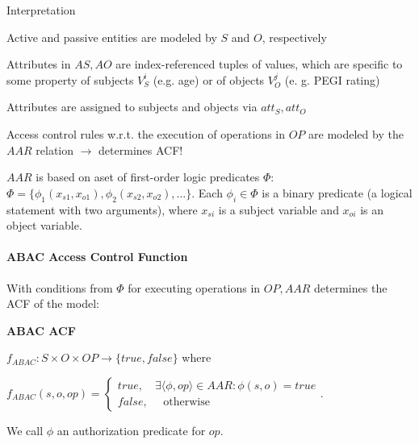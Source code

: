 \documentclass[a4paper]{article}
\renewcommand{\note}[2]{\begin{noteBox} \textbf{#1} #2 \end{noteBox}}
\begin{document}
\begin{multicols}{3}
    Interpretation
    \begin{itemize*}
        \item Active and passive entities are modeled by $S$ and $O$, respectively
        \item Attributes in $AS,AO$ are index-referenced tuples of values, which are specific to some property of subjects $V_S^i$ (e.g. age) or of objects $V_O^j$ (e. g. PEGI rating)
        \item Attributes are assigned to subjects and objects via $att_S,att_O$
        \item Access control rules w.r.t. the execution of operations in $OP$ are modeled by the $AAR$ relation $\rightarrow$ determines ACF!
        \item $AAR$ is based on aset of first-order logic predicates $\Phi$: $\Phi=\{\phi_1 (x_{s1},x_{o1}),\phi_2 (x_{s2},x_{o2}),...\}$. Each $\phi_i\in\Phi$ is a binary predicate (a logical statement with two arguments), where $x_{si}$ is a subject variable and $x_{oi}$ is an object variable.
    \end{itemize*}


    \paragraph{ABAC Access Control Function}
    With conditions from $\Phi$ for executing operations in $OP,AAR$ determines the ACF of the model:

    \note{ABAC ACF}{
        \begin{itemize*}
            \item $f_{ABAC}:S\times O\times OP\rightarrow\{true,false\}$ where
            \item $f_{ABAC}(s,o,op)= \begin{cases} true, \quad\exists ⟨\phi,op⟩\in AAR:\phi(s,o)=true\\ false, \quad\text{ otherwise } \end{cases}$.
            \item We call $\phi$ an authorization predicate for $op$.
        \end{itemize*}
    }


\end{multicols}
\end{document}
